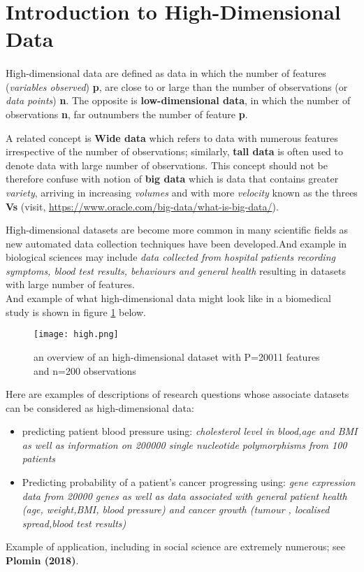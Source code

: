 \documentclass[12pt]{report}
\renewcommand{\emph}{\textit}
\begin{document}
	\section{Introduction to High-Dimensional Data}
\paragraph*{}
High-dimensional data are defined as data in which the number of features (\emph{variables observed}) \textbf{p}, are close to or large than the number of observations (or \emph{data points}) \textbf{n}. The opposite is \textbf{low-dimensional data}, in which the number of observations \textbf{n}, far outnumbers the number of feature \textbf{p}.

A related concept is \textbf{Wide data} which refers to data with numerous features irrespective of the number of observations; similarly, \textbf{tall data} is often used to denote data with large number of observations. This concept should not be therefore confuse with notion of \textbf{big data} which is data that contains greater \textit{variety}, arriving in increasing \textit{volumes} and with more \textit{velocity} known as the threes \textbf{Vs} (visit, \url{https://www.oracle.com/big-data/what-is-big-data/}).

High-dimensional datasets are become more common in many scientific fields as new automated data collection techniques have been developed.And example in biological sciences may include \textit{data collected from hospital patients recording symptoms, blood test results, behaviours and general health} resulting in datasets with large number of features.\\
And example of what high-dimensional data might look like in a biomedical study is shown in figure \ref{tab1} below.
\begin{figure}[h!]
	\begin{center}
		\texttt{[image: high.png]}
	\end{center}
	\caption[An high-dimensional dataset.]{an overview of an high-dimensional dataset  with P=20011  features and n=200 observations}
	\label{tab1}
\end{figure}
Here are examples of descriptions of research questions whose associate datasets can be considered as high-dimensional data:
\begin{itemize}
	\item predicting patient blood pressure using: \textit{cholesterol level in blood,age and BMI as well as information on 200000 single nucleotide polymorphisms from 100 patients}
	\item Predicting probability of a patient's cancer progressing using: \textit{gene expression data from 20000 genes as well as data associated with general patient health (age, weight,BMI, blood pressure) and cancer growth (tumour , localised spread,blood test results)}
\end{itemize}
Example of application, including in social science are extremely numerous; see \textbf{Plomin (2018)}.
\end{document}
